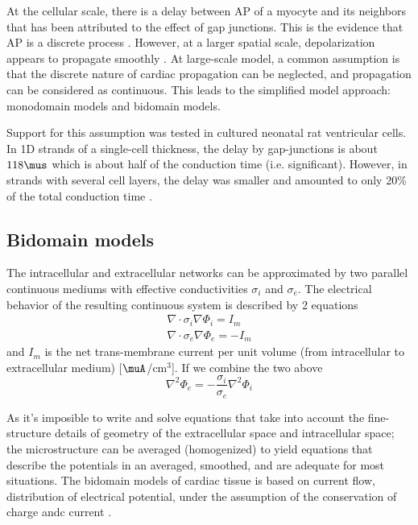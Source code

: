 At the cellular scale, there is a delay between AP of a myocyte and its
neighbors that has been attributed to the effect of gap junctions. This is the
evidence that AP is a discrete process \citep{kleber2004bmc}. However, at a
larger spatial scale, depolarization appears to propagate smoothly
\citep{durrer1970}. 
At large-scale model, a common assumption is that the discrete nature of cardiac
propagation can be neglected, and propagation can be considered as continuous.
This leads to the simplified model approach: monodomain models and bidomain
models. 

Support for this assumption was tested in cultured neonatal rat
ventricular cells.  In 1D strands of a single-cell thickness, the delay by
gap-junctions is about $118\mus$ which is about half of the conduction time
(i.e. significant). However, in strands with several cell layers, the delay was
smaller and amounted to only 20\% of the total conduction time \citep{fast1993}. 

\subsection{Bidomain models}
\label{sec:bidomain-models}

The intracellular and extracellular networks can be
approximated by two parallel continuous mediums with effective conductivities
$\sigma_i$ and $\sigma_e$. The electrical behavior of the resulting continuous
system is described by 2 equations
\begin{equation}
\begin{split}
\nabla \cdot \sigma_i \nabla \Phi_i = I_m  \\
\nabla \cdot \sigma_e \nabla \Phi_e = -I_m
\end{split}
\end{equation}
and $I_m$ is the net trans-membrane current per unit volume (from intracellular
to extracellular medium) [$\muA$/cm$^3$]. If we combine the two above
\begin{equation}
\nabla^2 \Phi_e =- \frac{\sigma_i}{\sigma_e} \nabla^2 \Phi_i 
\end{equation}


As it's imposible to write and solve equations that take into account the
fine-structure details of geometry of the extracellular space and intracellular
space; the microstructure can be averaged (homogenized) to yield equations that
describe the potentials in an averaged, smoothed, and are adequate for most
situations. The bidomain models of cardiac tissue is based on current flow,
distribution of electrical potential, under the assumption of the conservation
of charge andc current \citep{henriquez1993}.

